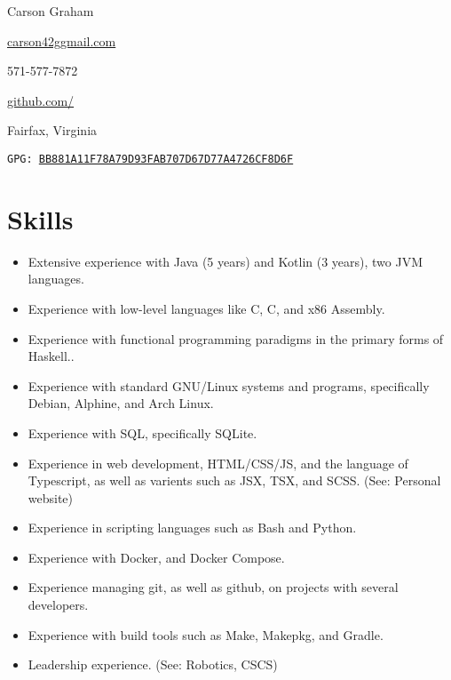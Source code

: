 \documentclass[10pt,letterpaper]{article}
\makeatletter
\def\link#1#2{\color{blue!60!black}\href{#1}{#2}\color{black}}
\newcommand{\CPP}
{C\nolinebreak[4]\hspace{-.05em}\raisebox{.35ex}{\footnotesize\bf ++}}
\newcommand{\email}
{carson42g\raisebox{-0.2ex}{@}gmail.com}
\newcommand{\github}
{github.com\hspace{-0.007em}/\hspace{-0.05em}{mee42}}
\def\code#1{\texttt{#1}}
\def\paddedItem#1{\vspace{-0.4em}\item #1}
\makeatother
\begin{document}
    \thispagestyle{empty}
    \begin{center}
        \huge Carson Graham
    \end{center}

    \begin{adjustwidth}{0em}{0em}
        \begin{multicols}{4}
            \begin{center}
                \link{mailto:carson42g@gmail.com}{\email}
            \end{center}
            \columnbreak
            \begin{center}
                571-577-7872
            \end{center}
            \columnbreak
            \begin{center}
                \link{https://github.com/mee42/}{\github}
            \end{center}
            \columnbreak
            \begin{center}
                Fairfax, Virginia
            \end{center}
        \end{multicols}
    \end{adjustwidth}
    \vspace{-1em}
    \begin{center}
        \code{GPG: \link{https://keys.openpgp.org/search?q=BB881A11F78A79D93FAB707D67D77A4726CF8D6F}{BB881A11F78A79D93FAB707D67D77A4726CF8D6F}}
     \end{center}

        

    \section*{Skills}

    \begin{itemize}
        \paddedItem Extensive experience with Java (5 years) and Kotlin (3 years), two JVM languages.
        \paddedItem Experience with low-level languages like C, \CPP, and x86 Assembly.
        \paddedItem Experience with functional programming paradigms in the primary forms of Haskell..
        \paddedItem Experience with standard GNU/Linux systems and programs, specifically Debian, Alphine, and Arch Linux.
        \paddedItem Experience with SQL, specifically SQLite.
        \paddedItem Experience in web development, HTML/CSS/JS, and the language of Typescript,
            as well as varients such as JSX, TSX, and SCSS. (See: Personal website)
        \paddedItem Experience in scripting languages such as Bash and Python.
        \paddedItem Experience with Docker, and Docker Compose.
        \paddedItem Experience managing git, as well as github, on projects with several developers.
        \paddedItem Experience with build tools such as Make, Makepkg, and Gradle.
        \paddedItem Leadership experience. (See: Robotics, CSCS)
    \end{itemize}
\end{document}
